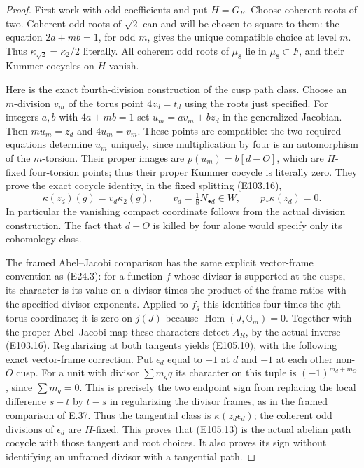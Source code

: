 \begin{proof}
First work with odd coefficients and put $H=G_F$.
Choose coherent roots of two.  Coherent odd roots of $\sqrt2$
can and will be chosen to square to them: the equation
$2a+mb=1$, for odd $m$, gives the unique compatible choice
at level $m$.  Thus
$\kappa_{\sqrt2}=\kappa_2/2$ literally.
All coherent odd roots of $\mu_8$ lie in $\mu_8\subset F$,
and their Kummer cocycles on $H$ vanish.

Here is the exact fourth-division construction of the cusp
path class.  Choose an $m$-division $v_m$ of the torus point
$4z_d=t_d$ using the roots just specified.  For integers
$a,b$ with $4a+mb=1$ set $u_m=a v_m+b z_d$ in the
generalized Jacobian.  Then
$m u_m=z_d$ and $4u_m=v_m$.
These points are compatible: the two required equations
determine $u_m$ uniquely, since multiplication by four is
an automorphism of the $m$-torsion.  Their proper images are
$p(u_m)=b[d-O]$, which are $H$-fixed four-torsion points;
thus their proper Kummer cocycle is literally zero.
They prove the exact
cocycle identity, in the fixed splitting (E103.16),
\[
       \kappa(z_d)(g)=v_d\kappa_2(g),\qquad
       v_d=\tfrac18 N_{\bullet d}\in W,
       \qquad p_*\kappa(z_d)=0.
 \tag{E105.13}
\]
In particular the vanishing compact coordinate follows from
the actual division construction.  The fact that $d-O$ is
killed by four alone would specify only its cohomology class.

The framed Abel--Jacobi comparison has the same explicit
vector-frame convention as (E24.3): for a function $f$ whose
divisor is supported at the cusps, its character is its value
on a divisor times the product of the frame ratios with the
specified divisor exponents.  Applied to $f_q$ this identifies
four times the $q$th torus coordinate; it is zero on $j(J)$
because $\operatorname{Hom}(J,\mathbb G_m)=0$.
Together with the proper Abel--Jacobi map these characters
detect $A_R$, by the actual inverse (E103.16).
Regularizing at both tangents yields (E105.10), with the
following exact vector-frame correction.  Put $\epsilon_d$
equal to $+1$ at $d$ and $-1$ at each other non-$O$ cusp.
For a unit with divisor $\sum m_q q$ its character on this
tuple is $(-1)^{m_d+m_O}$, since $\sum m_q=0$.
This is precisely the two endpoint sign from replacing
the local difference $s-t$ by $t-s$ in regularizing the
divisor frames, as in the framed comparison of E.37.
Thus the tangential class is $\kappa(z_d\epsilon_d)$;
the coherent odd divisions of $\epsilon_d$ are $H$-fixed.
This proves that (E105.13) is
the actual abelian path cocycle with those tangent and root
choices.  It also proves its sign without identifying an
unframed divisor with a tangential path.


\end{proof}
